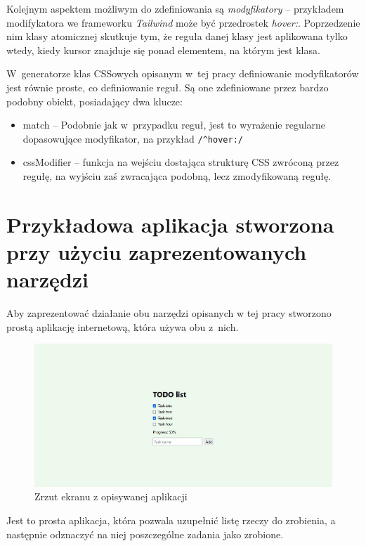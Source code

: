 \documentclass{SGGW-thesis}
\begin{document}
Kolejnym aspektem możliwym do zdefiniowania są \emph{modyfikatory} -- przykładem modifykatora we frameworku \emph{Tailwind} może być przedrostek \emph{hover:}. Poprzedzenie nim klasy atomicznej skutkuje tym, że reguła danej klasy jest aplikowana tylko wtedy, kiedy kursor znajduje się ponad elementem, na którym jest klasa.

W~generatorze klas CSSowych opisanym w~tej pracy definiowanie modyfikatorów jest równie proste, co definiowanie reguł. Są one zdefiniowane przez bardzo podobny obiekt, posiadający dwa klucze:
\begin{itemize}
    \item match -- Podobnie jak w~przypadku reguł, jest to wyrażenie regularne dopasowujące modyfikator, na przykład \verb|/^hover:/|
    \item cssModifier -- funkcja na wejściu dostająca strukturę CSS zwróconą przez regułę, na wyjściu zaś zwracająca podobną, lecz zmodyfikowaną regułę.
\end{itemize}


\chapter{Przykładowa aplikacja stworzona przy użyciu zaprezentowanych narzędzi}
Aby zaprezentować działanie obu narzędzi opisanych w tej pracy stworzono prostą aplikację internetową, która używa obu z~nich.

\begin{figure}[h]
    \centering
    \includegraphics[width=\textwidth]{test-app.png}
    \caption{Zrzut ekranu z opisywanej aplikacji}
\end{figure}

Jest to prosta aplikacja, która pozwala uzupełnić listę rzeczy do zrobienia, a następnie odznaczyć na niej poszczególne zadania jako zrobione.
\end{document}
